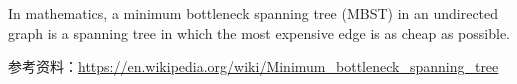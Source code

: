 \documentclass[a4paper, justified]{tufte-handout}
\begin{document}

\begin{ot}
  In mathematics, a minimum bottleneck spanning tree (MBST) in an undirected graph is a spanning tree in which the most expensive edge is as cheap as possible.

  参考资料：\href{https://en.wikipedia.org/wiki/Minimum_bottleneck_spanning_tree}{https://en.wikipedia.org/wiki/Minimum\_bottleneck\_spanning\_tree}
\end{ot}





% 




\beginfb

% 
% 
\end{document}
